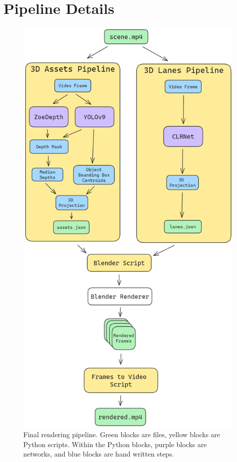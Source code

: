 \appendices
\raggedbottom

\section{Pipeline Details} \label{app:pipeline}
\begin{figure}[H]
  \centering
  \includegraphics[width=0.95\linewidth]{images/pipeline.png}
  \caption{Final rendering pipeline. Green blocks are files, yellow blocks are Python scripts. Within the Python blocks, purple blocks are networks, and blue blocks are hand written steps.}
  \label{fig:pipeline}
\end{figure}

